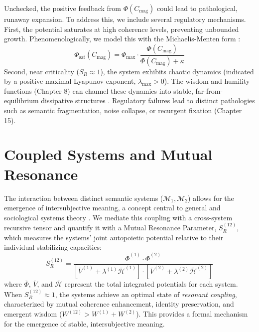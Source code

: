 Unchecked, the positive feedback from \(\Phi(C_{\mathrm{mag}})\) could lead to pathological, runaway expansion. To address this, we include several regulatory mechanisms. First, the potential saturates at high coherence levels, preventing unbounded growth. Phenomenologically, we model this with the Michaelis-Menten form \autocite{MichaelisMenten1913}:
\begin{equation}
\Phi_{\text{sat}}(C_{\mathrm{mag}}) = \Phi_{\text{max}} \cdot \frac{\Phi(C_{\mathrm{mag}})}{\Phi(C_{\mathrm{mag}}) + \kappa}
\end{equation}
Second, near criticality (\(S_R \approx 1\)), the system exhibits chaotic dynamics (indicated by a positive maximal Lyapunov exponent, \(\lambda_{\text{max}} > 0\)). The wisdom and humility functions (Chapter 8) can channel these dynamics into stable, far-from-equilibrium dissipative structures \autocite{PrigogineStengers1984}. Regulatory failures lead to distinct pathologies such as semantic fragmentation, noise collapse, or recurgent fixation (Chapter 15).

\section{Coupled Systems and Mutual Resonance}

The interaction between distinct semantic systems (\(\mathcal{M}_1, \mathcal{M}_2\)) allows for the emergence of intersubjective meaning, a concept central to general and sociological systems theory \autocite{vonBertalanffy1968, Luhmann1995}. We mediate this coupling with a cross-system recursive tensor and quantify it with a Mutual Resonance Parameter, \(S_R^{(12)}\), which measures the systems' joint autopoietic potential relative to their individual stabilizing capacities:
\begin{equation}
S_R^{(12)} = \frac{\bar{\Phi}^{(1)} \cdot \bar{\Phi}^{(2)}}{[\bar{V}^{(1)} + \lambda^{(1)} \bar{\mathcal{H}}^{(1)}] \cdot [\bar{V}^{(2)} + \lambda^{(2)} \bar{\mathcal{H}}^{(2)}]}
\end{equation}
where \(\bar{\Phi}\), \(\bar{V}\), and \(\bar{\mathcal{H}}\) represent the total integrated potentials for each system. When \(S_R^{(12)} \approx 1\), the systems achieve an optimal state of \textit{resonant coupling}, characterized by mutual coherence enhancement, identity preservation, and emergent wisdom (\(W^{(12)} > W^{(1)} + W^{(2)}\)). This provides a formal mechanism for the emergence of stable, intersubjective meaning.